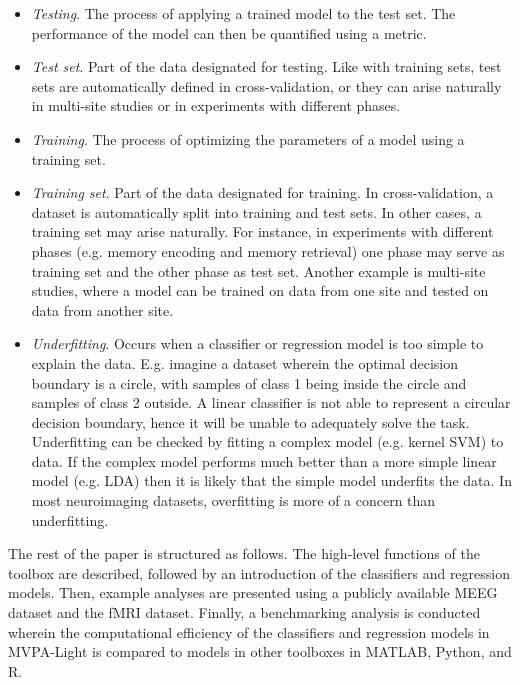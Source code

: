 \documentclass[utf8]{frontiersSCNS} %
\begin{document}
\begin{itemize}
\item \textit{Testing}. The process of applying a trained model to the test set. The performance of the model can then be quantified using a metric.
\item \textit{Test set}. Part of the data designated for testing. Like with training sets, test sets are automatically defined in cross-validation, or they can arise naturally in multi-site studies or in experiments with different phases. 
\item \textit{Training}. The process of optimizing the parameters of a model using a training set.
\item \textit{Training set}. Part of the data designated for training. In cross-validation, a dataset is automatically split into training and test sets. In other cases, a training set may arise naturally. For instance, in experiments with different phases (e.g. memory encoding and memory retrieval) one phase may serve as training set and the other phase as test set. Another example is multi-site studies, where a model can be trained on data from one site and tested on data from another site.
\item \textit{Underfitting}. Occurs when a classifier or regression model is too simple to explain the data. E.g. imagine a dataset wherein the optimal decision boundary is a circle, with samples of class 1 being inside the circle and samples of class 2 outside. A linear classifier is not able to represent a circular decision boundary, hence it will be unable to adequately solve the task. Underfitting can be checked by fitting a complex model (e.g. kernel SVM) to data. If the complex model performs much better than a more simple linear model (e.g. LDA) then it is likely that the simple model underfits the data. In most neuroimaging datasets, overfitting is more of a concern than underfitting.
\end{itemize}


The rest of the paper is structured as follows. The high-level functions of the toolbox are described, followed by an introduction of the classifiers and regression models. Then, example analyses are presented using a publicly available \cite{Wakeman2014OpenfMRI,Wakeman2015ADataset} MEEG dataset and the \cite{Haxby2001} fMRI dataset. Finally, a benchmarking analysis is conducted wherein the computational efficiency of the classifiers and regression models in MVPA-Light is compared to models in other toolboxes in MATLAB, Python, and R.


\end{document}

